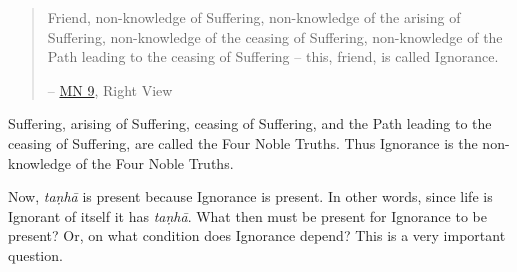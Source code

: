 \begin{quote}
Friend, non-knowledge of Suffering, non-knowledge of the arising of Suffering, non-knowledge of the ceasing of Suffering, non-knowledge of the Path leading to the ceasing of Suffering -- this, friend, is called Ignorance.

 -- \href{https://suttacentral.net/mn9/en/bodhi}{MN 9}, Right View
\end{quote}

Suffering, arising of Suffering, ceasing of Suffering, and the Path leading to the ceasing of Suffering, are called the Four Noble Truths. Thus Ignorance is the non-knowledge of the Four Noble Truths.

Now, \emph{taṇhā} is present because Ignorance is present. In other words, since life is Ignorant of itself it has \emph{taṇhā}. What then must be present for Ignorance to be present? Or, on what condition does Ignorance depend? This is a very important question.

